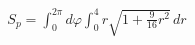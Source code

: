 \documentclass[preview]{standalone}
\begin{document}
\begin{align*}
S_p = \int_0^{2\pi} d\varphi \int_0^4 r \sqrt{1 + \frac{9}{16} r^2} \, dr
\end{align*}
\end{document}
